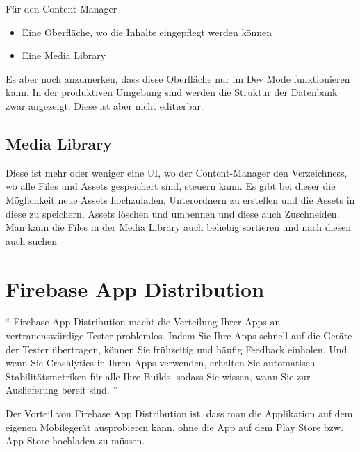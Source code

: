 Für den Content-Manager
\begin{itemize}
    \item Eine Oberfläche, wo die Inhalte eingepflegt werden können
    \item Eine Media Library
\end{itemize}

Es aber noch anzumerken, dass diese Oberfläche nur im Dev Mode funktionieren kann. In der produktiven Umgebung sind werden die Struktur der Datenbank zwar angezeigt. Diese ist aber nicht editierbar.


\subsection{Media Library}

Diese ist mehr oder weniger eine UI, wo der Content-Manager den Verzeichness, wo alle Files und Assets gespeichert sind, steuern kann.
Es gibt bei dieser die Möglichkeit neue Assets hochzuladen, Unterordnern zu erstellen und die Assets in diese zu speichern, Assets löschen und umbennen und diese auch Zuschneiden.
Man kann die Files in der Media Library auch beliebig sortieren und nach diesen auch suchen
\cite{media-library}




\section{Firebase App Distribution}

``
Firebase App Distribution macht die Verteilung
Ihrer Apps an vertrauenswürdige Tester problemlos. Indem Sie Ihre Apps schnell
auf die Geräte der Tester übertragen, können Sie frühzeitig und häufig
Feedback einholen.
Und wenn Sie Crashlytics in Ihren Apps verwenden, erhalten Sie automatisch Stabilitätsmetriken für alle Ihre Builds, sodass Sie wissen, wann Sie zur Auslieferung bereit sind.
''\cite{fire-base-app-distribution}

Der Vorteil von Firebase App Distribution ist,
dass man die Applikation auf dem eigenen Mobilegerät ausprobieren kann,
ohne die App auf dem Play Store bzw. App Store hochladen zu müssen.